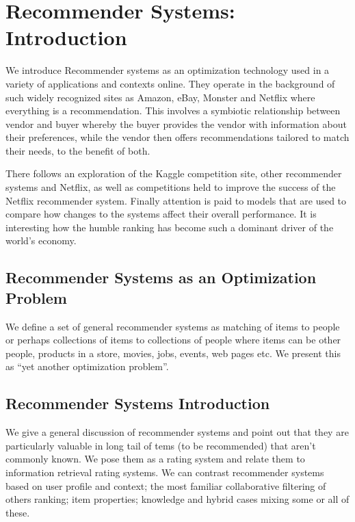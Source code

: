 \section{Recommender Systems:
Introduction}\label{recommender-systems-introduction}

We introduce Recommender systems as an optimization technology used in a
variety of applications and contexts online. They operate in the
background of such widely recognized sites as Amazon, eBay, Monster and
Netflix where everything is a recommendation. This involves a symbiotic
relationship between vendor and buyer whereby the buyer provides the
vendor with information about their preferences, while the vendor then
offers recommendations tailored to match their needs, to the benefit of
both.

There follows an exploration of the Kaggle competition site, other
recommender systems and Netflix, as well as competitions held to improve
the success of the Netflix recommender system. Finally attention is paid
to models that are used to compare how changes to the systems affect
their overall performance. It is interesting how the humble ranking has
become such a dominant driver of the world's economy.



\subsection{Recommender Systems as an Optimization
Problem}\label{recommender-systems-as-an-optimization-problem}

We define a set of general recommender systems as matching of items to
people or perhaps collections of items to collections of people where
items can be other people, products in a store, movies, jobs, events,
web pages etc. We present this as ``yet another optimization problem''.



\subsection{Recommender Systems
Introduction}\label{recommender-systems-introduction-1}

We give a general discussion of recommender systems and point out that
they are particularly valuable in long tail of tems (to be recommended)
that aren't commonly known. We pose them as a rating system and relate
them to information retrieval rating systems. We can contrast
recommender systems based on user profile and context; the most familiar
collaborative filtering of others ranking; item properties; knowledge
and hybrid cases mixing some or all of these.

